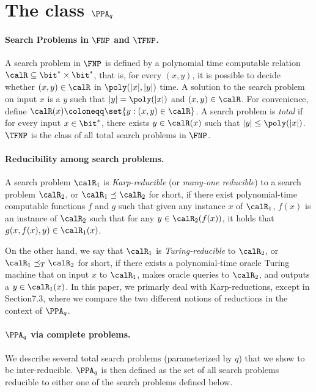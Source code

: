 \setcounter{section}{1}
\setcounter{theorem}{5}
\section{\boldmath The class $\PPA_q$}
\label{sec:definitions}

\paragraph{\boldmath Search Problems in $\FNP$ and $\TFNP$.} A search problem
in $\FNP$ is defined by a polynomial time computable relation
$\calR\subseteq \bit^* \times \bit^*$, that is, for every $(x,y)$, it is
possible to decide whether $(x,y) \in \calR$ in $\poly(|x|, |y|)$ time. A
solution to the search problem on input $x$ is a $y$ such that
$|y| = \poly(|x|)$ and $(x,y) \in \calR$. For convenience, define
$\calR(x) \coloneqq \set{y : (x,y) \in \calR}$. A search problem is {\em total}
if for every input $x \in \bit^*$, there exists $y \in \calR(x)$ such that $|y|
\le \poly(|x|)$. $\TFNP$ is the class of all total search problems in $\FNP$.

\paragraph{Reducibility among search problems.} A search problem $\calR_1$ is
{\em Karp-reducible} (or {\em many-one reducible}) to a search problem
$\calR_2$, or $\calR_1 \preceq \calR_2$ for short, if there exist polynomial-time computable functions $f$ and $g$ such that given any instance $x$ of $\calR_1$, $f(x)$ is an instance of $\calR_2$ such that for any $y \in \calR_2(f(x))$, it holds that $g(x, f(x), y) \in \calR_1(x)$.

On the other hand, we say that $\calR_1$ is {\em Turing-reducible} to $\calR_2$, or $\calR_1 \preceq_T \calR_2$ for short, if there exists a polynomial-time oracle Turing machine that on input $x$ to $\calR_1$, makes oracle queries to $\calR_2$, and outputs a $y \in \calR_1(x)$. In this paper, we primarly deal with Karp-reductions, except in Section7.3, where we compare the two different notions of reductions in the context of $\PPA_q$.

\paragraph{\boldmath $\PPA_q$ via complete problems.} We describe several total search problems (parameterized by $q$) that we show to be inter-reducible. $\PPA_q$ is then defined as the set of all search problems reducible to either one of the search problems defined below.

